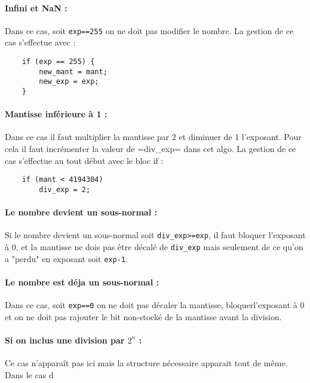 \documentclass[10pt,a4paper,twoside]{article}
\begin{document}
\paragraph{Infini et NaN :} Dans ce cas, soit \verb!exp==255! on ne doit pas modifier le nombre. La gestion de ce cas s'effectue avec :
\begin{verbatim}
	if (exp == 255) {
		new_mant = mant;
		new_exp = exp;
	}
\end{verbatim}

\paragraph{Mantisse inférieure à 1 :} Dans ce cas il faut multiplier la mantisse par 2 et diminuer de 1 l'exposant. Pour cela il
faut incrémenter la valeur de \ver=div_exp= dans cet algo. La gestion de ce cas s'effectue au tout début avec le bloc if :
\begin{verbatim}
	if (mant < 4194304)
		div_exp = 2;
\end{verbatim}

\paragraph{Le nombre devient un sous-normal :} Si le nombre devient un sous-normal soit \verb!div_exp>=exp!, il faut bloquer
l'exposant à 0, et la mantisse ne dois pas être décalé de \verb=div_exp= mais seulement de ce qu'on a "perdu" en exposant soit
\verb=exp-1=.

\paragraph{Le nombre est déja un sous-normal :} Dans ce cas, soit \verb!exp==0! on ne doit pas décaler la mantisse, bloquerl'exposant à 0 et on ne
doit pas rajouter le bit non-stocké de la mantisse avant la division.

\paragraph{Si on inclus une division par $2^n$ :} Ce cas n'apparaît pas ici mais la structure nécessaire apparait tout de même. Dans
le cas d
\end{document}
